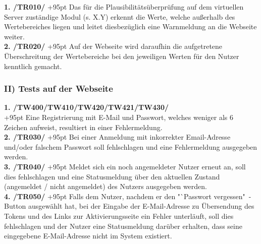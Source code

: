 \documentclass[fontsize = 12pt, paper = a4]{scrreprt}
\begin{document}
\vspace*{3mm}

\textbf{1. /TR010/}
\hangindent+95pt 
\hspace*{8mm}
Das für die Plausibilitätsüberprüfung auf dem virtuellen Server zuständige Modul (s. X.Y) erkennt die Werte, welche außerhalb des Wertebereiches liegen und leitet diesbezüglich eine Warnmeldung an die Webseite weiter. \\

\textbf{2. /TR020/}
\hangindent+95pt 
\hspace*{5.5mm}
Auf der Webseite wird daraufhin die aufgetretene Überschreitung der Wertebereiche bei den jeweiligen Werten für den Nutzer kenntlich gemacht.



\subsubsection*{II) Tests auf der Webseite}

\vspace*{3mm}

\textbf{1. /TW400/TW410/TW420/TW421/TW430/}\\
\hangindent+95pt 
Eine Registrierung mit E-Mail und Passwort, welches weniger als 6 Zeichen aufweist, resultiert in einer Fehlermeldung.\\

\textbf{2. /TR030/}
\hangindent+95pt 
\hspace*{8mm}
Bei einer Anmeldung mit inkorrekter Email-Adresse und/oder falschem Passwort soll fehlschlagen und eine Fehlermeldung ausgegeben werden. \\

\textbf{3. /TR040/}
\hangindent+95pt 
\hspace*{6.5mm}
Meldet sich ein noch angemeldeter Nutzer erneut an, soll dies fehlschlagen und eine Statusmeldung über den aktuellen Zustand (angemeldet / nicht angemeldet) des Nutzers ausgegeben werden. \\

\textbf{4. /TR050/}
\hangindent+95pt 
\hspace*{5.5mm}
Falls dem Nutzer, nachdem er den "`Passwort vergessen"\ - Button ausgewählt hat, bei der Eingabe der E-Mail-Adresse zu Übersendung des Tokens und des Links zur Aktivierungsseite ein Fehler unterläuft, soll dies fehlschlagen und der Nutzer eine Statusmeldung darüber erhalten, dass seine eingegebene E-Mail-Adresse nicht im System existiert.  
\end{document}
